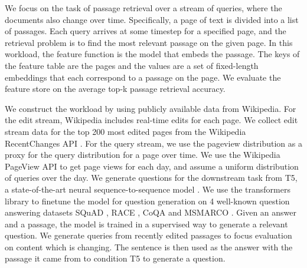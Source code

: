 
We focus on the task of passage retrieval over a stream of queries, where the documents also change over time. Specifically, a page of text is divided into a list of passages. Each query arrives at some timestep for a specified page, and the retrieval problem is to find the most relevant passage on the given page. In this workload, the feature function is the model that embeds the passage. The keys of the feature table are the pages and the values are a set of fixed-length embeddings that each correspond to a passage on the page. We evaluate the feature store on the average top-k passage retrieval accuracy.


We construct the workload by using publicly available data from Wikipedia. For the edit stream, Wikipedia includes real-time edits for each page. We collect edit stream data for the top 200 most edited pages from the Wikipedia RecentChanges API \cite{wiki:recentchanges}. For the query stream, we use the pageview distribution as a proxy for the query distribution for a page over time. We use the Wikipedia PageView API \cite{wiki:pageview} to get page views for each day, and assume a uniform distribution of queries over the day. We generate questions for the downstream task from T5, a state-of-the-art neural sequence-to-sequence model \cite{raffel2020exploring}. We use the transformers library \cite{wolf-etal-2020-transformers} to finetune the model for question generation on 4 well-known question answering datasets SQuAD \cite{rajpurkar2016squad}, RACE \cite{lai2017race}, CoQA \cite{reddy2019coqa} and MSMARCO \cite{nguyen2016ms}. Given an answer and a passage, the model is trained in a supervised way to generate a relevant question. We generate queries from recently edited passages to focus evaluation on content which is changing. The sentence is then used as the answer with the passage it came from to condition T5 to generate a question.


